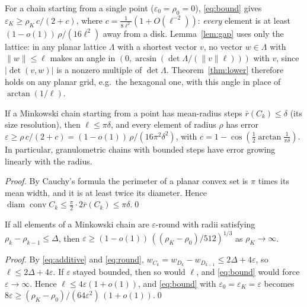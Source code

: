 \documentclass[runningheads]{llncs}
\newcommand{\conv}{\operatorname{conv}}
\newcommand{\diam}{\operatorname{diam}}
\begin{document}
For a chain starting from a single point ($\varepsilon_0=\rho_0=0$), \eqref{eq:bound} gives $\varepsilon_K\ge\rho_K\,c/(2+c)$, where $c=\frac{1}{8\ell^2}(1+O(\ell^{-2}))$: \emph{every} element is at least $(1-o(1))\,\rho/(16\ell^2)$ away from a disk. Lemma~\ref{lem:gap} uses only the lattice: in any planar lattice $\Lambda$ with a shortest vector $v$, no vector $w\in\Lambda$ with $\|w\|\le\ell$ makes an angle in $(0,\arcsin(\det\Lambda/(\|v\|\ell)))$ with $v$, since $|\det(v,w)|$ is a nonzero multiple of $\det\Lambda$. Theorem~\ref{thm:lower} therefore holds on any planar grid, e.g.\ the hexagonal one, with this angle in place of $\arctan(1/\ell)$.
\begin{corollary}\label{cor:mean}
If a Minkowski chain starting from a point has mean-radius steps $\bar r(C_k)\le\delta$ (its size resolution), then $\ell\le\pi\delta$, and every element of radius $\rho$ has error $\varepsilon\ge\rho\,c/(2+c)=(1-o(1))\,\rho/(16\pi^2\delta^2)$, with $c=1-\cos(\frac12\arctan\frac1{\pi\delta})$. In particular, granulometric chains with bounded steps have error growing linearly with the radius.
\end{corollary}
\begin{proof}
By Cauchy's formula the perimeter of a planar convex set is $\pi$ times its mean width, and it is at least twice its diameter. Hence $\diam\conv C_k\le\frac\pi2\cdot2\bar r(C_k)\le\pi\delta$.\qed
\end{proof}

\begin{corollary}\label{cor:fitted}
If all elements of a Minkowski chain are $\varepsilon$-round with radii satisfying $\rho_k-\rho_{k-1}\le\Delta$, then $\varepsilon\ge(1-o(1))\,((\rho_K-\rho_0)/512)^{1/3}$ as $\rho_K\to\infty$.
\end{corollary}
\begin{proof}
By \eqref{eq:additive} and \eqref{eq:round}, $w_{C_k}=w_{D_k}-w_{D_{k-1}}\le2\Delta+4\varepsilon$, so $\ell\le2\Delta+4\varepsilon$. If $\varepsilon$ stayed bounded, then so would $\ell$, and \eqref{eq:bound} would force $\varepsilon\to\infty$. Hence $\ell\le4\varepsilon(1+o(1))$, and \eqref{eq:bound} with $\varepsilon_0=\varepsilon_K=\varepsilon$ becomes $8\varepsilon\ge(\rho_K-\rho_0)/(64\varepsilon^2)\,(1+o(1))$.\qed
\end{proof}
\end{document}
